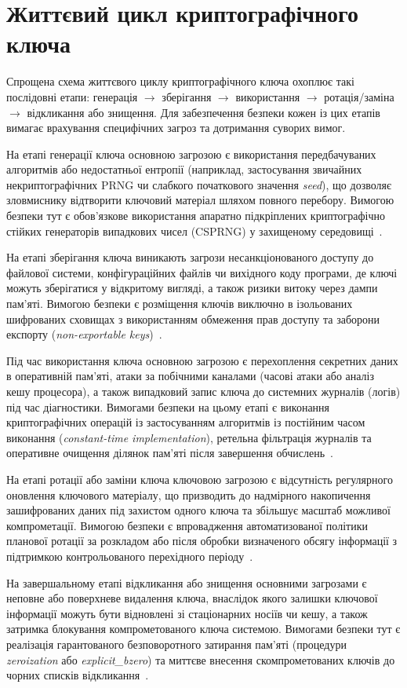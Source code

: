 \section{Життєвий цикл криптографічного ключа}

Спрощена схема життєвого циклу криптографічного ключа охоплює такі послідовні етапи: генерація
$\rightarrow$ зберігання $\rightarrow$ використання $\rightarrow$ ротація/заміна $\rightarrow$ відкликання
або знищення. Для забезпечення безпеки кожен із цих етапів вимагає врахування специфічних загроз та
дотримання суворих вимог.

На етапі генерації ключа основною загрозою є використання передбачуваних алгоритмів або недостатньої
ентропії (наприклад, застосування звичайних некриптографічних PRNG чи слабкого початкового значення
\textit{seed}), що дозволяє зловмиснику відтворити ключовий матеріал шляхом повного перебору. Вимогою
безпеки тут є обов'язкове використання апаратно підкріплених криптографічно стійких генераторів
випадкових чисел (CSPRNG) у захищеному середовищі~\cite{SP800-90A}.

На етапі зберігання ключа виникають загрози несанкціонованого доступу до файлової системи,
конфігураційних файлів чи вихідного коду програми, де ключі можуть зберігатися у відкритому вигляді, а
також ризики витоку через дампи пам'яті. Вимогою безпеки є розміщення ключів виключно в ізольованих
шифрованих сховищах з використанням обмеження прав доступу та заборони експорту
(\textit{non-exportable keys})~\cite{SP800-57}.

Під час використання ключа основною загрозою є перехоплення секретних даних в оперативній пам'яті,
атаки за побічними каналами (часові атаки або аналіз кешу процесора), а також випадковий запис ключа до
системних журналів (логів) під час діагностики. Вимогами безпеки на цьому етапі є виконання
криптографічних операцій із застосуванням алгоритмів із постійним часом виконання
(\textit{constant-time implementation}), ретельна фільтрація журналів та оперативне очищення ділянок пам'яті
після завершення обчислень~\cite{SP800-57}.

На етапі ротації або заміни ключа ключовою загрозою є відсутність регулярного оновлення ключового
матеріалу, що призводить до надмірного накопичення зашифрованих даних під захистом одного ключа та
збільшує масштаб можливої компрометації. Вимогою безпеки є впровадження автоматизованої політики
планової ротації за розкладом або після обробки визначеного обсягу інформації з підтримкою
контрольованого перехідного періоду~\cite{SP800-57}.

На завершальному етапі відкликання або знищення основними загрозами є неповне або поверхневе
видалення ключа, внаслідок якого залишки ключової інформації можуть бути відновлені зі стаціонарних
носіїв чи кешу, а також затримка блокування компрометованого ключа системою. Вимогами безпеки тут є
реалізація гарантованого безповоротного затирання пам'яті (процедури \textit{zeroization} або
\textit{explicit\_bzero}) та миттєве внесення скомпрометованих ключів до чорних списків відкликання~\cite{FIPS140-3}.
